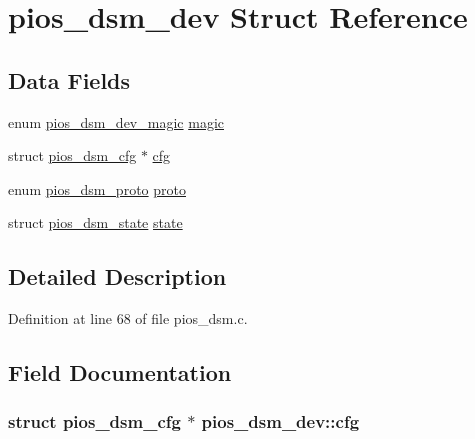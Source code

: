 \hypertarget{structpios__dsm__dev}{\section{pios\-\_\-dsm\-\_\-dev \-Struct \-Reference}
\label{structpios__dsm__dev}
}
\subsection*{\-Data \-Fields}
\begin{DoxyCompactItemize}
\item 
enum \hyperlink{group___p_i_o_s___d_s_m_gaa8fd2b8b7432f69244c6af0ffd1c3c4b}{pios\-\_\-dsm\-\_\-dev\-\_\-magic} \hyperlink{structpios__dsm__dev_af1374f09784777b8222cd59d6c41ba1f}{magic}
\item 
struct \hyperlink{structpios__dsm__cfg}{pios\-\_\-dsm\-\_\-cfg} $\ast$ \hyperlink{structpios__dsm__dev_af3f5de7ec63a657c04db4bc6480b8c87}{cfg}
\item 
enum \hyperlink{group___p_i_o_s___d_s_m_ga0c64890f0b9cb4fd7681b2d92fad8bd9}{pios\-\_\-dsm\-\_\-proto} \hyperlink{structpios__dsm__dev_a1f236c86046b7aa2f08742d1c9c03940}{proto}
\item 
struct \hyperlink{structpios__dsm__state}{pios\-\_\-dsm\-\_\-state} \hyperlink{structpios__dsm__dev_a03ca4dcf548ecee1772b76d3eefad122}{state}
\end{DoxyCompactItemize}


\subsection{\-Detailed \-Description}


\-Definition at line 68 of file pios\-\_\-dsm.\-c.



\subsection{\-Field \-Documentation}
\hypertarget{structpios__dsm__dev_af3f5de7ec63a657c04db4bc6480b8c87}{
\subsubsection[{cfg}]{\setlength{\rightskip}{0pt plus 5cm}struct {\bf pios\-\_\-dsm\-\_\-cfg} $\ast$ {\bf pios\-\_\-dsm\-\_\-dev\-::cfg}}}\label{structpios__dsm__dev_af3f5de7ec63a657c04db4bc6480b8c87}


